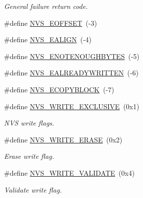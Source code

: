 \begin{DoxyCompactItemize}
\begin{DoxyCompactList}\small\item\em General failure return code. \end{DoxyCompactList}\item 
\#define \hyperlink{_n_v_s_8h_ab0d903829eae27a8c8680411df23a91d}{N\+V\+S\+\_\+\+E\+O\+F\+F\+S\+E\+T}~(-\/3)
\item 
\#define \hyperlink{_n_v_s_8h_a2f03b8cbbca79f4344b1ffb8ee66f364}{N\+V\+S\+\_\+\+E\+A\+L\+I\+G\+N}~(-\/4)
\item 
\#define \hyperlink{_n_v_s_8h_a5a750a60b3d829e466763a4ba46a441e}{N\+V\+S\+\_\+\+E\+N\+O\+T\+E\+N\+O\+U\+G\+H\+B\+Y\+T\+E\+S}~(-\/5)
\item 
\#define \hyperlink{_n_v_s_8h_a4db9b4f738a4b5439ab742060ad53ebd}{N\+V\+S\+\_\+\+E\+A\+L\+R\+E\+A\+D\+Y\+W\+R\+I\+T\+T\+E\+N}~(-\/6)
\item 
\#define \hyperlink{_n_v_s_8h_a946508ac9e10fec555f9ba4926fdce62}{N\+V\+S\+\_\+\+E\+C\+O\+P\+Y\+B\+L\+O\+C\+K}~(-\/7)
\item 
\#define \hyperlink{_n_v_s_8h_ab3235132a5cebc663aee601e238b8d98}{N\+V\+S\+\_\+\+W\+R\+I\+T\+E\+\_\+\+E\+X\+C\+L\+U\+S\+I\+V\+E}~(0x1)
\begin{DoxyCompactList}\small\item\em N\+V\+S write flags. \end{DoxyCompactList}\item 
\#define \hyperlink{_n_v_s_8h_afdf449ac94235c5c4b108f5e5e925f03}{N\+V\+S\+\_\+\+W\+R\+I\+T\+E\+\_\+\+E\+R\+A\+S\+E}~(0x2)
\begin{DoxyCompactList}\small\item\em Erase write flag. \end{DoxyCompactList}\item 
\#define \hyperlink{_n_v_s_8h_a7c3340627bf9957b1ea3c1e1e2e0eddc}{N\+V\+S\+\_\+\+W\+R\+I\+T\+E\+\_\+\+V\+A\+L\+I\+D\+A\+T\+E}~(0x4)
\begin{DoxyCompactList}\small\item\em Validate write flag. \end{DoxyCompactList}\end{DoxyCompactItemize}
